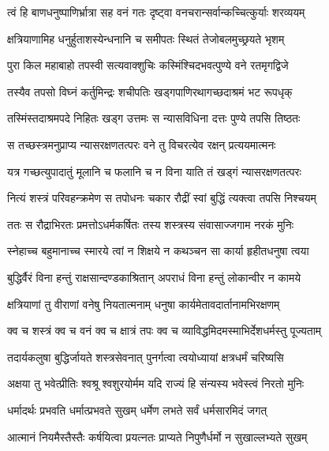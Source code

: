 \twolineshloka
{त्वं हि बाणधनुष्पाणिर्भ्रात्रा सह वनं गतः}
{दृष्ट्वा वनचरान्सर्वान्कच्चित्कुर्याः शरव्ययम्} %

\twolineshloka
{क्षत्रियाणामिह धनुर्हुताशस्येन्धनानि च}
{समीपतः स्थितं तेजोबलमुच्छ्रयते भृशम्} %

\twolineshloka
{पुरा किल महाबाहो तपस्वी सत्यवाक्शुचिः}
{कस्मिंश्चिदभवत्पुण्ये वने रतमृगद्विजे} %

\twolineshloka
{तस्यैव तपसो विघ्नं कर्तुमिन्द्रः शचीपतिः}
{खड्गपाणिरथागच्छदाश्रमं भट रूपधृक्} %

\twolineshloka
{तस्मिंस्तदाश्रमपदे निहितः खड्ग उत्तमः}
{स न्यासविधिना दत्तः पुण्ये तपसि तिष्ठतः} %

\twolineshloka
{स तच्छस्त्रमनुप्राप्य न्यासरक्षणतत्परः}
{वने तु विचरत्येव रक्षन् प्रत्ययमात्मनः} %

\twolineshloka
{यत्र गच्छत्युपादातुं मूलानि च फलानि च}
{न विना याति तं खड्गं न्यासरक्षणतत्परः} %

\twolineshloka
{नित्यं शस्त्रं परिवहन्क्रमेण स तपोधनः}
{चकार रौद्रीं स्वां बुद्धिं त्यक्त्वा तपसि निश्चयम्} %

\twolineshloka
{ततः स रौद्राभिरतः प्रमत्तोऽधर्मकर्षितः}
{तस्य शस्त्रस्य संवासाज्जगाम नरकं मुनिः} %

\twolineshloka
{स्नेहाच्च बहुमानाच्च स्मारये त्वां न शिक्षये}
{न कथञ्चन सा कार्या हृहीतधनुषा त्वया} %

\twolineshloka
{बुद्धिर्वैरं विना हन्तुं राक्षसान्दण्डकाश्रितान्}
{अपराधं विना हन्तुं लोकान्वीर न कामये} %

\twolineshloka
{क्षत्रियाणां तु वीराणां वनेषु नियतात्मनाम्}
{धनुषा कार्यमेतावदार्तानामभिरक्षणम्} %

\twolineshloka
{क्व च शस्त्रं क्व च वनं क्व च क्षात्रं तपः क्व च}
{व्याविद्धमिदमस्माभिर्देशधर्मस्तु पूज्यताम्} %

\twolineshloka
{तदार्यकलुषा बुद्धिर्जायते शस्त्रसेवनात्}
{पुनर्गत्वा त्वयोध्यायां क्षत्रधर्मं चरिष्यसि} %

\twolineshloka
{अक्षया तु भवेत्प्रीतिः श्वश्रू श्वशुरयोर्मम}
{यदि राज्यं हि संन्यस्य भवेस्त्वं निरतो मुनिः} %

\twolineshloka
{धर्मादर्थः प्रभवति धर्मात्प्रभवते सुखम्}
{धर्मेण लभते सर्वं धर्मसारमिदं जगत्} %

\twolineshloka
{आत्मानं नियमैस्तैस्तैः कर्षयित्वा प्रयत्नतः}
{प्राप्यते निपुणैर्धर्मो न सुखाल्लभ्यते सुखम्} %

